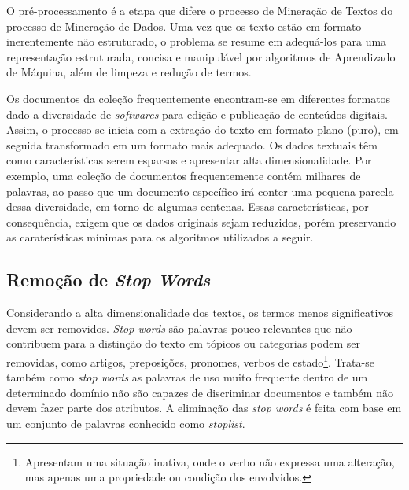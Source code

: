 


O pré-processamento é a etapa que difere o processo de Mineração de Textos do processo de Mineração de Dados. Uma vez que os texto estão em formato inerentemente não estruturado, o problema se resume em adequá-los para uma representação estruturada, concisa e manipulável por algoritmos de Aprendizado de Máquina, além de limpeza e redução de termos.



Os documentos da coleção frequentemente encontram-se em diferentes formatos dado a diversidade de \textit{softwares} para edição e publicação de conteúdos digitais. Assim, o processo se inicia com a extração do texto em formato plano (puro), em seguida transformado em um formato mais adequado. 
%
%
% 
Os dados textuais têm como características serem esparsos e apresentar alta dimensionalidade. Por exemplo, uma coleção de documentos frequentemente contém milhares de palavras, ao passo que um documento específico irá conter uma pequena parcela dessa diversidade, em torno de algumas centenas. Essas características, por consequência, exigem que os dados originais sejam reduzidos, porém preservando as caraterísticas mínimas para os algoritmos utilizados a seguir.


\subsection*{Remoção de \textit{Stop Words}}

Considerando a alta dimensionalidade dos textos, os termos menos significativos devem ser removidos.  \textit{Stop words} são palavras pouco relevantes que não contribuem para a distinção do texto em tópicos ou categorias podem ser removidas, como artigos, preposições, pronomes, verbos de estado\footnote{Apresentam uma situação inativa, onde o verbo não expressa uma alteração, mas apenas uma propriedade ou condição dos envolvidos.}. Trata-se também como \textit{stop words} as palavras de uso muito frequente dentro de um determinado domínio não são capazes de discriminar documentos e também não devem fazer parte dos atributos. A eliminação das \textit{stop words} é feita com base em um conjunto de palavras conhecido como \textit{stoplist}.








